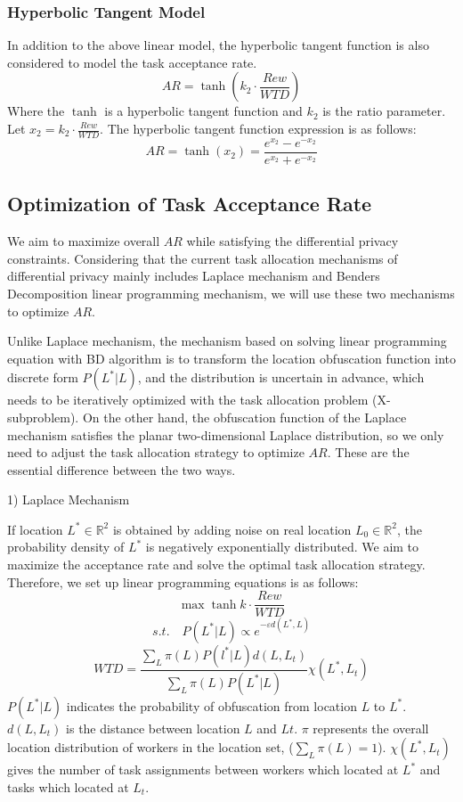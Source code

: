 \subsubsection{Hyperbolic Tangent Model}
In addition to the above linear model, the hyperbolic tangent function is also considered to model the task acceptance rate.
$$
	AR=\tanh (k_2 \cdot \frac{Rew}{WTD})
$$
Where the $\tanh$ is a hyperbolic tangent function and $k_2$ is the ratio parameter. Let $x_2=k_2 \cdot \frac{Rew}{WTD}$. The hyperbolic tangent function expression is as follows:
$$
	AR=\tanh (x_2)=\frac{e^{x_2}-e^{-x_2}}{e^{x_2}+e^{-x_2}}
$$

\subsection{Optimization of Task Acceptance Rate} %
We aim to maximize overall $AR$ while satisfying the differential privacy constraints. Considering that the current task allocation mechanisms of differential privacy mainly includes Laplace mechanism and Benders Decomposition linear programming mechanism, we will use these two mechanisms to optimize $AR$.

Unlike Laplace mechanism, the mechanism based on solving linear programming equation with BD algorithm is to transform the location obfuscation function into discrete form $P(L^*|L)$, and the distribution is uncertain in advance, which needs to be iteratively optimized with the task allocation problem (X-subproblem). On the other hand, the obfuscation function of the Laplace mechanism satisfies the planar two-dimensional Laplace distribution, so we only need to adjust the task allocation strategy to optimize $AR$. These are the essential difference between the two ways.

1) Laplace Mechanism

If location $L^* \in \mathbb R^2$ is obtained by adding noise on real location $L_0 \in \mathbb R^2$, the probability density of $L^*$ is negatively exponentially distributed. We aim to maximize the acceptance rate and solve the optimal task allocation strategy. Therefore, we set up linear programming equations is as follows:
$$
	\max \tanh {k \cdot \frac{Rew}{WTD}}
$$
$$
	s.t. \quad P(L^*|L) \propto e^{-\varepsilon d(L^*,L)}
$$
$$
	WTD=\frac {\sum_L \pi(L) P(l^*|L) d(L,L_t)} {\sum_L \pi(L) P(L^*|L)} \chi(L^*,L_t)
$$
$P(L^*|L)$ indicates the probability of obfuscation from location $L$ to $L^*$. $d(L,L_t)$ is the distance between location $L$ and $Lt$. $\pi$ represents the overall location distribution of workers in the location set, ($\sum_L \pi(L)=1$). $\chi(L^*,L_t)$ gives the number of task assignments between workers which located at $L^*$ and tasks which located at $L_t$. 

